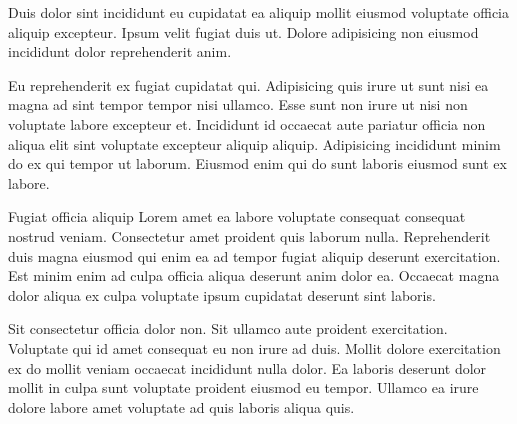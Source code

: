 \myPortfolioChapter{\TEXTacknowledgements}



Duis dolor sint incididunt eu cupidatat ea aliquip mollit eiusmod voluptate officia aliquip excepteur. Ipsum velit fugiat duis ut. Dolore adipisicing non eiusmod incididunt dolor reprehenderit anim.

Eu reprehenderit ex fugiat cupidatat qui. Adipisicing quis irure ut sunt nisi ea magna ad sint tempor tempor nisi ullamco. Esse sunt non irure ut nisi non voluptate labore excepteur et. Incididunt id occaecat aute pariatur officia non aliqua elit sint voluptate excepteur aliquip aliquip. Adipisicing incididunt minim do ex qui tempor ut laborum. Eiusmod enim qui do sunt laboris eiusmod sunt ex labore.

Fugiat officia aliquip Lorem amet ea labore voluptate consequat consequat nostrud veniam. Consectetur amet proident quis laborum nulla. Reprehenderit duis magna eiusmod qui enim ea ad tempor fugiat aliquip deserunt exercitation. Est minim enim ad culpa officia aliqua deserunt anim dolor ea. Occaecat magna dolor aliqua ex culpa voluptate ipsum cupidatat deserunt sint laboris.

Sit consectetur officia dolor non. Sit ullamco aute proident exercitation. Voluptate qui id amet consequat eu non irure ad duis. Mollit dolore exercitation ex do mollit veniam occaecat incididunt nulla dolor. Ea laboris deserunt dolor mollit in culpa sunt voluptate proident eiusmod eu tempor. Ullamco ea irure dolore labore amet voluptate ad quis laboris aliqua quis.

